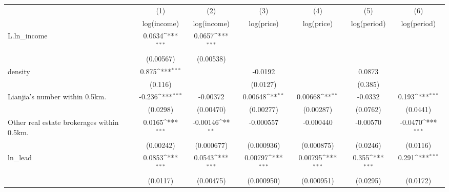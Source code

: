 {
\def\sym#1{\ifmmode^{#1}\else\(^{#1}\)\fi}
\begin{tabular}{l*{6}{c}}
\toprule
                    &\multicolumn{1}{c}{(1)}&\multicolumn{1}{c}{(2)}&\multicolumn{1}{c}{(3)}&\multicolumn{1}{c}{(4)}&\multicolumn{1}{c}{(5)}&\multicolumn{1}{c}{(6)}\\
                    &\multicolumn{1}{c}{log(income)}&\multicolumn{1}{c}{log(income)}&\multicolumn{1}{c}{log(price)}&\multicolumn{1}{c}{log(price)}&\multicolumn{1}{c}{log(period)}&\multicolumn{1}{c}{log(period)}\\
\midrule
L.ln\_income         &      0.0634\sym{***}&      0.0657\sym{***}&                     &                     &                     &                     \\
                    &   (0.00567)         &   (0.00538)         &                     &                     &                     &                     \\
\addlinespace
density             &       0.875\sym{***}&                     &     -0.0192         &                     &      0.0873         &                     \\
                    &     (0.116)         &                     &    (0.0127)         &                     &     (0.385)         &                     \\
\addlinespace
Lianjia's number within 0.5km.&      -0.236\sym{***}&    -0.00372         &     0.00648\sym{**} &     0.00668\sym{**} &     -0.0332         &       0.193\sym{***}\\
                    &    (0.0298)         &   (0.00470)         &   (0.00277)         &   (0.00287)         &    (0.0762)         &    (0.0441)         \\
\addlinespace
Other real estate brokerages within 0.5km.&      0.0165\sym{***}&    -0.00146\sym{**} &   -0.000557         &   -0.000440         &    -0.00570         &     -0.0470\sym{***}\\
                    &   (0.00242)         &  (0.000677)         &  (0.000936)         &  (0.000875)         &    (0.0246)         &    (0.0116)         \\
\addlinespace
ln\_lead             &      0.0853\sym{***}&      0.0543\sym{***}&     0.00797\sym{***}&     0.00795\sym{***}&       0.355\sym{***}&       0.291\sym{***}\\
                    &    (0.0117)         &   (0.00475)         &  (0.000950)         &  (0.000951)         &    (0.0295)         &    (0.0172)         \\

\end{tabular}}
